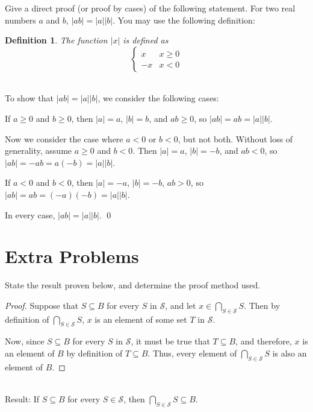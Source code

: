 \documentclass[12 pt]{exam}
\newtheorem{definition}{Definition}
\begin{document}
\begin{questions}
\question Give a direct proof (or proof by cases) of  the following statement.
For two real numbers $a$ and $b$, $|ab|=|a||b|$.  You may use the following definition:
\begin{definition}
The function $|x|$ is defined as $$\begin{cases} x & x \geq 0 \\ -x & x<0 \end{cases}$$
\end{definition}
\begin{solution}\\
To show that $|ab| = |a||b|$, we consider the following cases:

If $a \ge 0$ and $b \ge 0$, then $|a| = a$, $|b| = b$, and $ab \ge 0$, so $|ab| = ab = |a||b|$.

Now we consider the case where $a < 0$ or $b < 0$, but not both.
Without loss of generality, assume $a \ge 0$ and $b < 0$.
Then $|a| = a$, $|b| = -b$, and $ab < 0$, so $|ab| = -ab = a(-b) = |a||b|$.

If $a < 0$ and $b < 0$, then $|a| = -a$, $|b| = -b$, $ab > 0$, so $|ab| = ab = (-a)(-b) = |a||b|$.

In every case, $|ab| = |a||b|$. \qed
\end{solution}



\newpage
\section*{Extra Problems}


\question State the result proven below, and determine the proof method used.
\begin{proof}
Suppose that $S \subseteq B$ for every $S$ in $\mathcal{S}$, and let $x \in \displaystyle{ \bigcap_{S \in \mathcal{S}}S}$. Then by definition of $\displaystyle{ \bigcap_{S \in \mathcal{S}}S}$, $x$ is an element of some set $T$ in $\mathcal{S}$.

\hspace{.4in} Now, since $S \subseteq B$ for every $S$ in $\mathcal{S}$, it must be true that $T \subseteq B$, and therefore, $x$ is an element of $B$ by definition of $T \subseteq B$. Thus, every element of $\displaystyle{ \bigcap_{S \in \mathcal{S}}S}$ is also an element of $B$.
\end{proof}
\begin{solution}\\
Result: If $S \subseteq B$ for every $S \in \mathcal{S}$, then $\bigcap_{S \in \mathcal{S}} S \subseteq B$.


\end{solution}
\end{questions}
\end{document}
